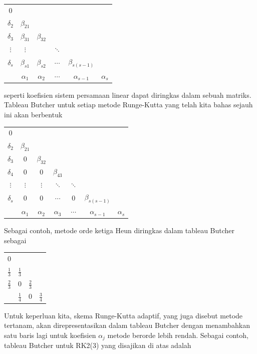 \begin{center}
\begin{tabular}{c|ccccc}
0 &  &  &  &  & \tabularnewline
$\delta_{2}$ & $\beta_{21}$ &  &  &  & \tabularnewline
$\delta_{3}$ & $\beta_{31}$ & $\beta_{32}$ &  &  & \tabularnewline
$\vdots$ & $\vdots$ &  & $\ddots$ &  & \tabularnewline
$\delta_{s}$ & $\beta_{s1}$ & $\beta_{s2}$ & $\cdots$ & $\beta_{s(s-1)}$ & \tabularnewline
\hline 
 & $\alpha_{1}$ & $\alpha_{2}$ & $\cdots$ & $\alpha_{s-1}$ & $\alpha_{s}$\tabularnewline
\end{tabular}
\par\end{center}

\noindent seperti koefisien sistem persamaan linear dapat diringkas
dalam sebuah matriks. Tableau Butcher untuk setiap metode Runge-Kutta
yang telah kita bahas sejauh ini akan berbentuk

\begin{center}
\begin{tabular}{c|cccccc}
0 &  &  &  &  &  & \tabularnewline
$\delta_{2}$ & $\beta_{21}$ &  &  &  &  & \tabularnewline
$\delta_{3}$ & 0 & $\beta_{32}$ &  &  &  & \tabularnewline
$\delta_{4}$ & 0 & 0 & $\beta_{43}$ &  &  & \tabularnewline
$\vdots$ & $\vdots$ & $\vdots$ & $\ddots$ & $\ddots$ &  & \tabularnewline
$\delta_{s}$ & 0 & 0 & $\cdots$ & 0 & $\beta_{s(s-1)}$ & \tabularnewline
\hline 
 & $\alpha_{1}$ & $\alpha_{2}$ & $\alpha_{3}$ & $\cdots$ & $\alpha_{s-1}$ & $\alpha_{s}$\tabularnewline
\end{tabular}
\par\end{center}

\noindent Sebagai contoh, metode orde ketiga Heun diringkas dalam
tableau Butcher sebagai

\begin{center}
\begin{tabular}{c|ccc}
0 &  &  & \tabularnewline
$\frac{1}{3}$ & $\frac{1}{3}$ &  & \tabularnewline
$\frac{2}{3}$ & 0 & $\frac{2}{3}$ & \tabularnewline
\hline 
 & $\frac{1}{4}$ & 0 & $\frac{3}{4}$\tabularnewline
\end{tabular}
\par\end{center}

\noindent Untuk keperluan kita, skema Runge-Kutta adaptif, yang juga
disebut metode tertanam, akan direpresentasikan dalam tableau Butcher
dengan menambahkan satu baris lagi untuk koefisien $\alpha_{j}$ metode
berorde lebih rendah. Sebagai contoh, tableau Butcher untuk RK2(3)
yang disajikan di atas adalah

